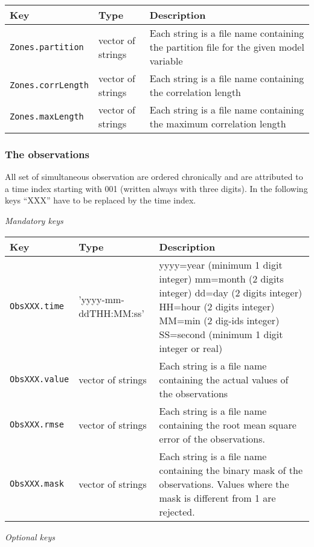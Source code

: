 \documentclass[a4paper,12pt]{article}
\newcommand{\code}{\texttt}
\newenvironment{keytabular}{\begin{tabular}{|p{0.3\textwidth}|p{0.2\textwidth}|p{0.5\textwidth}|} \hline Key & Type & Description \\ \hline \hline }{\end{tabular}}
\newcommand{\subsubsubsection}[1]{\bigskip \textit{#1} \medskip}
\begin{document}
\begin{keytabular}
\code{Zones.partition} & vector of strings & Each string is a file name containing
  the partition file for the given model variable
\\
\code{Zones.corrLength} & vector of strings & Each string is a file name containing 
  the correlation length
\\
\code{Zones.maxLength} & vector of strings & Each string is a file name containing 
  the maximum correlation length
\\
\hline
\end{keytabular}


\subsubsection{The observations}

All set of simultaneous observation are ordered chronically and are attributed to a time
index starting with 001 (written always with three digits). In the
following keys ``XXX'' have to be replaced by the time index. 


\subsubsubsection{Mandatory keys}

\begin{keytabular}
\code{ObsXXX.time} & 'yyyy-mm-ddTHH:MM:ss' &
  yyyy=year  (minimum 1 digit integer)
  mm=month (2 digits integer)
  dd=day   (2 digits integer)
  HH=hour (2 digits integer)
  MM=min  (2 dig-ids integer)
  SS=second (minimum 1 digit integer or real)
\\  
\code{ObsXXX.value} & vector of strings & Each string is a file name containing
  the actual values of the observations
\\
\code{ObsXXX.rmse} & vector of strings & Each string is a file name containing 
  the root mean square error of the observations.
\\
\code{ObsXXX.mask} & vector of strings & Each string is a file name containing 
  the binary mask of the observations. Values where the mask is different
  from 1 are rejected.
\\
\hline
\end{keytabular}

\subsubsubsection{Optional keys}
\end{document}
